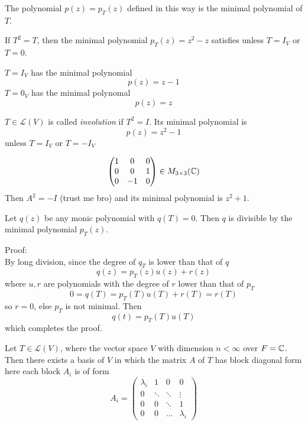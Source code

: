 \documentclass[12pt]{article}
\begin{document}
\begin{defn}
	The polynomial $p(z)=p_T(z)$ defined in this way is the minimal polynomial of $T$.
\end{defn}

\begin{ex}
	If $T^2=T$, then the minimal polynomial $p_T(z) = z^2 - z$ satisfies unless $T=I_V$ or $T=0$.
\end{ex}

\begin{ex}
	$T=I_V$ has the minimal polynomial
	$$p(z) = z-1$$
	$T=0_V$ has the minimal polynomal
	$$p(z) = z$$
\end{ex}

\begin{ex}
	$T\in\mathcal L(V)$ is called \emph{involution} if $T^2=I$. Its minimal polynomial is
	$$p(z)=z^2-1$$
	unless $T=I_V$ or $T=-I_V$
\end{ex}

\begin{ex}
	$$\begin{pmatrix}1 & 0 & 0 \\ 0 & 0 & 1 \\ 0 & -1 & 0\end{pmatrix}\in M_{3\times 3}(\mathbb{C})$$
	Then $A^2 = -I$ (trust me bro) and its minimal polynomial is $z^2+1$.
\end{ex}

\begin{thm}
	Let $q(z)$ be any monic polynomial with $q(T)=0$. Then $q$ is divisible by the minimal polynomial $p_T(z)$.
\end{thm}

Proof: \\
By long division, since the degree of $q_T$ is lower than that of $q$
$$q(z) = p_T(z)u(z) + r(z)$$
where $u,r$ are polynomials with the degree of $r$ lower than that of $p_T$
$$0=q(T) = p_T(T)u(T)+r(T) = r(T)$$
so $r=0$, else $p_T$ is not minimal. Then
$$q(t) = p_T(T)u(T)$$
which completes the proof.

\begin{thm}Let $T\in\mathcal L(V)$, where the vector space $V$ with dimension $n<\infty$ over $F=\mathbb{C}$. Then there exists a basis of $V$ in which the matrix $A$ of $T$ has block diagonal form here each block $A_i$ is of form
	$$A_i = \begin{pmatrix} \lambda_i & 1 & 0 & 0 \\ 0 & \ddots & \ddots & \vdots \\ 0 & 0 & \ddots & 1 \\ 0 & 0 & \dots & \lambda_i\end{pmatrix}$$
\end{thm}
\end{document}
